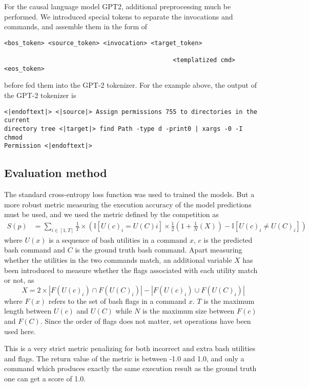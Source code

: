 For the causal language model GPT2, additional preprocessing much be
performed. We introduced special tokens to separate the invocations and
commands, and assemble them in the form of

\begin{verbatim}
<bos_token> <source_token> <invocation> <target_token>

                                              <templatized cmd> <eos_token> 
\end{verbatim}
before fed them into the GPT-2 tokenizer. For the example above, the output of the GPT-2 tokenizer is
\begin{verbatim}
<|endoftext|> <|source|> Assign permissions 755 to directories in the current
directory tree <|target|> find Path -type d -print0 | xargs -0 -I chmod 
Permission <|endoftext|>

\end{verbatim}


\subsection{Evaluation method}
The standard cross-entropy loss function was used to trained the models. But a more robust metric measuring the execution accuracy of the model predictions must be used, and we used the metric defined by the competition as
\begin{align*}
	S(p) & =\sum_{i\in[1,T]}\frac{1}{T}\times\left(
	\mathbb{I}[U(c)_i=U(C)i]\times\frac{1}{2}\left(
		1+\frac{1}{N}\left(X\right)\right) -\mathbb{I}[U(c)_i\ne U(C)_i]
	\right)
\end{align*}
where $U(x)$ is a sequence of bash utilities in a command $x$, $c$ is the
predicted bash command and $C$ is the ground truth bash command.
Apart measuring whether the utilities in the two commands match, an additional variable $X$ has been introduced to measure whether the flags associated with each utility match or not, as
\begin{equation*}
	X = 2\times
	|F(U(c)_i)\cap F(U(C)_i)| - |F(U(c)_i)\cup F(U(C)_i)|
\end{equation*}
where $F(x)$ refers to
the set of bash flags in a command $x$. $T$ is the maximum length between
$U(c)$ and $U(C)$ while $N$ is the maximum size between $F(c)$ and $F(C)$. Since the order of flags does not matter, set operations have been used here.

This is a very strict metric penalizing for both incorrect and extra bash utilities and flags. The return value of the metric is between -1.0 and 1.0, and only a command which produces exactly the same execution result as the ground truth one can get a score of 1.0.